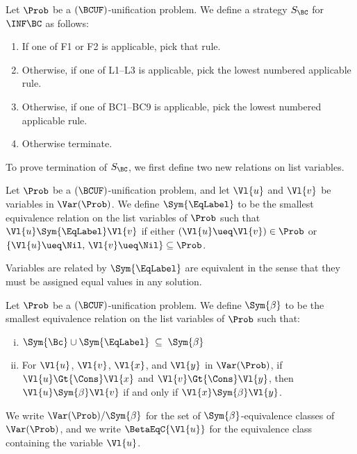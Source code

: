 \begin{Definition}
    Let $\Prob$ be a $(\BCUF)$-unification problem. We define a strategy
    $S_\BC$ for $\INF\BC$ as follows:
    \begin{enumerate}[(1)]
        \item If one of F1 or F2 is applicable, pick that rule.
        \item Otherwise, if one of L1--L3 is applicable, pick the lowest
            numbered applicable rule.
        \item Otherwise, if one of BC1--BC9 is applicable, pick the lowest
            numbered applicable rule.
        \item Otherwise terminate.
    \end{enumerate}
\end{Definition}

To prove termination of $S_\BC$, we first define two new relations on list
variables.

\begin{Definition}
    Let $\Prob$ be a $(\BCUF)$-unification problem, and let $\Vl{u}$ and
    $\Vl{v}$ be variables in $\Var(\Prob)$. We define $\Sym{\EqLabel}$ to be
    the smallest equivalence relation on the list variables of $\Prob$ such
    that $\Vl{u} \Sym{\EqLabel} \Vl{v}$ if either $(\Vl{u} \ueq \Vl{v}) \in
    \Prob$ or $\{\Vl{u} \ueq \Nil, \, \Vl{v} \ueq \Nil\} \subseteq \Prob$.
\end{Definition}

Variables are related by $\Sym{\EqLabel}$ are equivalent in the sense that they
must be assigned equal values in any solution.

\begin{Definition}
    Let $\Prob$ be a $(\BCUF)$-unification problem. We define $\Sym{\beta}$ to
    be the smallest equivalence relation on the list variables of $\Prob$ such
    that:
    \begin{enumerate}[(i)]
        \item ${\Sym{\Bc}} \cup {\Sym{\EqLabel}} \; \subseteq \; {\Sym{\beta}}$
        \item For $\Vl{u}$, $\Vl{v}$, $\Vl{x}$, and $\Vl{y}$ in $\Var(\Prob)$,
            if $\Vl{u} \Gt{\Cons} \Vl{x}$ and $\Vl{v} \Gt{\Cons} \Vl{y}$, then
            $\Vl{u} \Sym{\beta} \Vl{v}$ if and only if $\Vl{x} \Sym{\beta}
            \Vl{y}$.
    \end{enumerate}

    We write $\Var(\Prob)/{\Sym{\beta}}$ for the set of
    $\Sym{\beta}$-equivalence classes of $\Var(\Prob)$, and we write
    $\BetaEqC{\Vl{u}}$ for the equivalence class containing the variable
    $\Vl{u}$.
\end{Definition}

